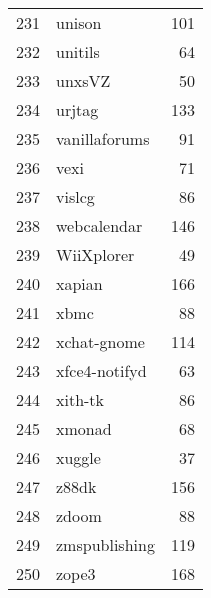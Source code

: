 \begin{table}[ht]
\begin{tabular}{rlr}
  231 & unison & 101 \\ 
  232 & unitils &  64 \\ 
  233 & unxsVZ &  50 \\ 
  234 & urjtag & 133 \\ 
  235 & vanillaforums &  91 \\ 
  236 & vexi &  71 \\ 
  237 & vislcg &  86 \\ 
  238 & webcalendar & 146 \\ 
  239 & WiiXplorer &  49 \\ 
  240 & xapian & 166 \\ 
  241 & xbmc &  88 \\ 
  242 & xchat-gnome & 114 \\ 
  243 & xfce4-notifyd &  63 \\ 
  244 & xith-tk &  86 \\ 
  245 & xmonad &  68 \\ 
  246 & xuggle &  37 \\ 
  247 & z88dk & 156 \\ 
  248 & zdoom &  88 \\ 
  249 & zmspublishing & 119 \\ 
  250 & zope3 & 168 \\ 
   \hline
\end{tabular}
\end{table}